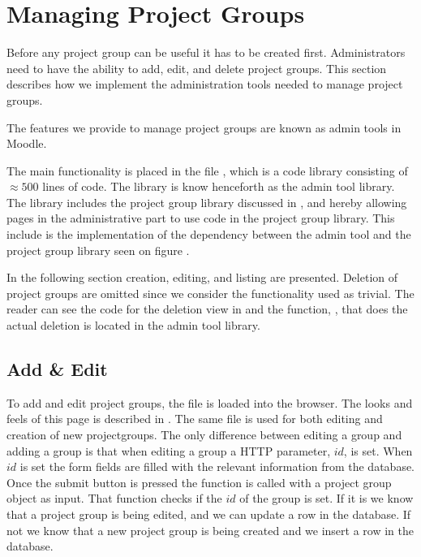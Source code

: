 \section{Managing Project Groups} %
\label{sec:manProjGrpImpl}
Before any project group can be useful it has to be created first.
Administrators need to have the ability to add, edit, and delete project groups.
This section describes how we implement the administration tools needed to manage project groups.

The features we provide to manage project groups are known as admin tools in Moodle.

The main functionality is placed in the file , which is a code library consisting of $\approx 500$ lines of code. 
The library is know henceforth as the admin tool library.
The library includes the project group library discussed in , and hereby allowing pages in the administrative part to use code in the project group library. 
This include is the implementation of the dependency between the admin tool and the project group library seen on figure . 

In the following section creation, editing, and listing are presented. 
Deletion of project groups are omitted since we consider the functionality used as trivial. 
The reader can see the code for the deletion view in  and the function, , that does the actual deletion is located in the admin tool library.

\subsection{Add \& Edit}
To add and edit project groups, the file  is loaded into the browser. 
The looks and feels of this page is described in .
The same file is used for both editing and creation of new projectgroups. 
The only difference between editing a group and adding a group is that when editing a group a HTTP parameter, $id$, is set.
When $id$ is set the form fields are filled with the relevant information from the database.
Once the submit button is pressed the function  is called with a project group object as input.
That function checks if the $id$ of the group is set. 
If it is we know that a project group is being edited, and we can update a row in the database.
If not we know that a new project group is being created and we insert a row in the database.


